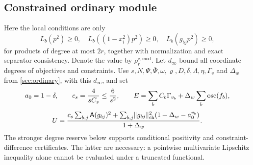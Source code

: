 \subsection{Constrained ordinary module}\label{sec:ext-mod}

Here the local conditions are only
\begin{equation}\label{eq:ext-mod-localizers}
 L_b(p^2)\ge0,\quad L_b((1-x_i^2)p^2)\ge0,\quad
 L_b(g_{bj}p^2)\ge0,
\end{equation}
for products of degree at most $2r$, together with normalization and exact
separator consistency. Denote the value by $\rho_r^{\mathrm{c,mod}}$.
Let $d_\infty$ bound all coordinate degrees of objectives and constraints.
Use $s,N,\Psi,\bar\Psi,\omega,\varrho,D,\delta,\Lambda,\eta,\Gamma_v$
and $\Delta_w$ from \cref{sec:ordinary}, with this $d_\infty$, and set
\[
 a_0=1-\delta,\qquad c_s=\frac4{sC_s}\le\frac6{s^2},\qquad
 E=\sum_b C_b\Gamma_{v_b}+\Delta_w\sum_b\operatorname{osc}(f_b),
\]
\begin{equation}\label{eq:ext-U}
 U=\frac{c_s\sum_{b,j}\mathsf{A}(g_{bj})^2+
 \sum_{b,j}\lVert g_{bj}\rVert_{\mathrm{ch}}^2(1+\Delta_w-a_0^{v_b})}{1+\Delta_w}.
\end{equation}
The stronger degree reserve below supports conditional positivity and
constraint-difference certificates. The latter are necessary: a
pointwise multivariate Lipschitz inequality alone cannot be evaluated
under a truncated functional.

